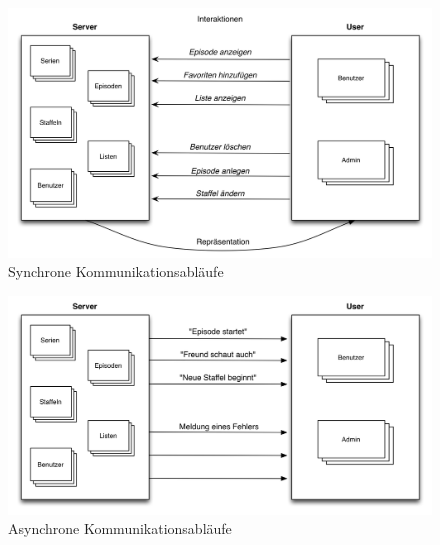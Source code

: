 \documentclass[a4paper]{article}
\begin{document}
\begin{figure}[H]
\includegraphics[width=1\textwidth]{images/kommunikationsablaeufe.png}
\caption{Synchrone Kommunikationsabläufe}
\label{kommunikationsablaeufe}
\end{figure}


\begin{figure}[H]
\includegraphics[width=1\textwidth]{images/kommunikationsablaeufeAsynchron.png}
\caption{Asynchrone Kommunikationsabläufe}
\label{kommunikationsablaeufeAsynchron}
\end{figure}
\end{document}

